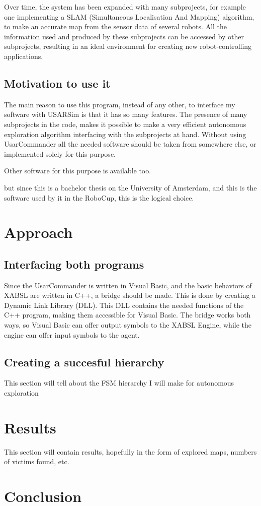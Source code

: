 \documentclass[a4paper,10pt]{article}
\begin{document}
Over time, the system has been expanded with many subprojects, for example one
implementing a SLAM
(Simultaneous Localisation And Mapping) algorithm, to make an accurate map from
the sensor data of several robots\cite{slamet2006manifoldslam}. All the information used and produced by
these subprojects can be accessed by other subprojects, resulting in an ideal
environment for creating new robot-controlling applications.

\subsection{Motivation to use it}
The main reason to use this program, instead of any other, to interface my
software with USARSim is that it has so many features. The presence of many
subprojects in the code, makes it possible to make a very efficient autonomous
exploration algorithm interfacing with the subprojects at hand. Without using UsarCommander all
the needed software should be taken from somewhere else, or implemented solely
for this purpose.

Other software for this purpose is available too. %

but since this is a bachelor
thesis on the University of Amsterdam, and this is the software used by it in
the RoboCup, this is the logical choice.
\section{Approach}

\subsection{Interfacing both programs}
Since the UsarCommander is written in Visual Basic, and the basic behaviors of
XABSL are written in C++, a bridge should be made. This is done by creating a
Dynamic Link Library (DLL). This DLL contains the needed functions of the C++
program, making them accessible for Visual Basic. The bridge works both ways, so
Visual Basic can offer output symbols to the XABSL Engine, while the engine can
offer input symbols to the agent.

\subsection{Creating a succesful hierarchy}
This section will tell about the FSM hierarchy I will make for autonomous
exploration


\section{Results}
This section will contain results, hopefully in the form of explored maps, numbers of victims found, etc.

\section{Conclusion}

{}

\end{document}
